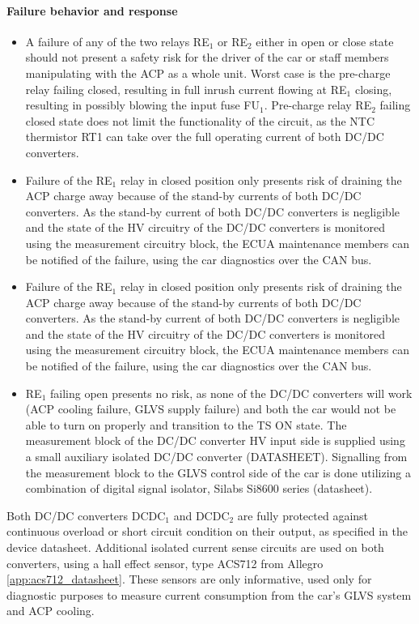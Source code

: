 \paragraph{Failure behavior and response}
\begin{itemize}
	\item A failure of any of the two relays RE$_1$ or RE$_2$ either in open or close state should not present a safety risk for the driver of the car or staff members manipulating with the ACP as a whole unit. 
	Worst case is the pre-charge relay failing closed, resulting in full inrush current flowing at RE$_1$ closing, resulting in possibly blowing the input fuse FU$_1$. Pre-charge relay RE$_2$ failing closed state does not limit the functionality of the circuit, as the NTC thermistor RT1 can take over the full operating current of both DC/DC converters.
	\item Failure of the RE$_1$ relay in closed position only presents risk of draining the ACP charge away because of the stand-by currents of both DC/DC converters. As the stand-by current of both DC/DC converters is negligible and the state of the HV circuitry of the DC/DC converters is monitored using the measurement circuitry block, the ECUA maintenance members can be notified of the failure, using the car diagnostics over the CAN bus.
	\item Failure of the RE$_1$ relay in closed position only presents risk of draining the ACP charge away because of the stand-by currents of both DC/DC converters. As the stand-by current of both DC/DC converters is negligible and the state of the HV circuitry of the DC/DC converters is monitored using the measurement circuitry block, the ECUA maintenance members can be notified of the failure, using the car diagnostics over the CAN bus. 
	\item RE$_1$ failing open presents no risk, as none of the DC/DC converters will work (ACP cooling failure, GLVS supply failure) and both the car would not be able to turn on properly and transition to the TS ON state.
	The measurement block of the DC/DC converter HV input side is supplied using a small auxiliary isolated DC/DC converter (DATASHEET). Signalling from the measurement block to the GLVS control side of the car is done utilizing a combination of digital signal isolator, Silabs Si8600 series (datasheet).
\end{itemize}


Both DC/DC converters DCDC$_1$ and DCDC$_2$ are fully protected against continuous overload or short circuit condition on their output, as specified in the device datasheet. Additional isolated current sense circuits are used on both converters, using a hall effect sensor, type ACS712 from Allegro \ref{app:acs712_datasheet}. These sensors are only informative, used only for diagnostic purposes to measure current consumption from the car's GLVS system and ACP cooling.

